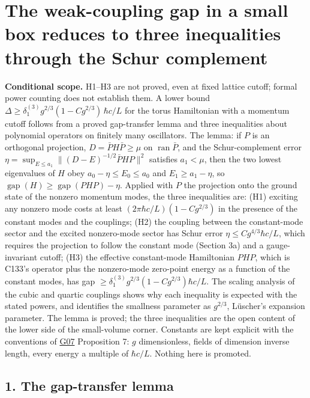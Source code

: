 \documentclass[11pt,a4paper]{article}
\begin{document}
\hypertarget{the-weak-coupling-gap-in-a-small-box-reduces-to-three-inequalities-through-the-schur-complement}{%
\section{The weak-coupling gap in a small box reduces to three
inequalities through the Schur
complement}\label{the-weak-coupling-gap-in-a-small-box-reduces-to-three-inequalities-through-the-schur-complement}}

\textbf{Conditional scope.} H1--H3 are not proved, even at fixed lattice
cutoff; formal power counting does not establish them. A lower bound
\(\Delta\ge\delta_1^{(3)}g^{2/3}(1-Cg^{2/3})\,\hbar c/L\) for the torus
Hamiltonian with a momentum cutoff follows from a proved gap-transfer
lemma and three inequalities about polynomial operators on finitely many
oscillators. The lemma: if \(P\) is an orthogonal projection,
\(D=\bar PH\bar P\ge\mu\) on \(\operatorname{ran}\bar P\), and the
Schur-complement error
\(\eta=\sup_{E\le a_1}\|(D-E)^{-1/2}\bar PHP\|^2\) satisfies
\(a_1<\mu\), then the two lowest eigenvalues of \(H\) obey
\(a_0-\eta\le E_0\le a_0\) and \(E_1\ge a_1-\eta\), so
\(\operatorname{gap}(H)\ge\operatorname{gap}(PHP)-\eta\). Applied with
\(P\) the projection onto the ground state of the nonzero momentum
modes, the three inequalities are: (H1) exciting any nonzero mode costs
at least \((2\pi\hbar c/L)(1-Cg^{2/3})\) in the presence of the constant
modes and the couplings; (H2) the coupling between the constant-mode
sector and the excited nonzero-mode sector has Schur error
\(\eta\le Cg^{4/3}\hbar c/L\), which requires the projection to follow
the constant mode (Section 3a) and a gauge-invariant cutoff; (H3) the
effective constant-mode Hamiltonian \(PHP\), which is C133's operator
plus the nonzero-mode zero-point energy as a function of the constant
modes, has gap \(\ge\delta_1^{(3)}g^{2/3}(1-Cg^{2/3})\hbar c/L\). The
scaling analysis of the cubic and quartic couplings shows why each
inequality is expected with the stated powers, and identifies the
smallness parameter as \(g^{2/3}\), Lüscher's expansion parameter. The
lemma is proved; the three inequalities are the open content of the
lower side of the small-volume corner. Constants are kept explicit with
the conventions of \href{low-dimensional-mass-gap.md}{G07} Proposition
7: \(g\) dimensionless, fields of dimension inverse length, every energy
a multiple of \(\hbar c/L\). Nothing here is promoted.

\hypertarget{the-gap-transfer-lemma}{%
\subsection{1. The gap-transfer lemma}\label{the-gap-transfer-lemma}}
\end{document}
